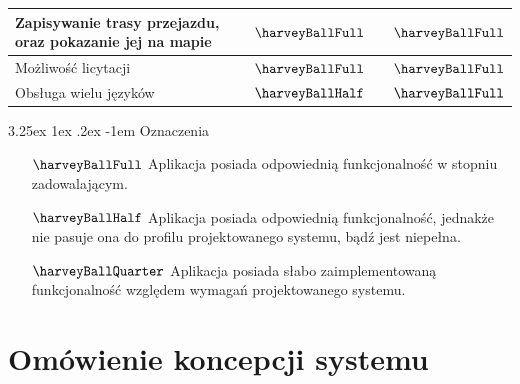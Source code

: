\documentclass[10pt,titlepage]{article} %
\makeatletter
\renewcommand{\normalsize}{\fontsize{8pt}{10pt}\selectfont} %
\renewcommand\paragraph{\@startsection{paragraph}{5}{\z@}%
  {3.25ex \@plus1ex \@minus.2ex}%
  {-1em}%
  {\normalfont\normalsize\bfseries}}
\makeatother
\begin{document}
\begin{table}[H]
\begin{tabular}{lccc}
\multicolumn{1}{|l|}{Zapisywanie trasy przejazdu, oraz pokazanie jej na mapie}                                                                                                   & \multicolumn{1}{c|}{$\harveyBallFull$}     & \multicolumn{1}{c|}{}              & \multicolumn{1}{c|}{$\harveyBallFull$}                                 \\ \hline
\multicolumn{1}{|l|}{Możliwość licytacji}                                                                                                                                        & \multicolumn{1}{c|}{$\harveyBallFull$}     & \multicolumn{1}{c|}{}              & \multicolumn{1}{c|}{$\harveyBallFull$}                                 \\ \hline
\multicolumn{1}{|l|}{Obsługa wielu języków}                                                                                                                                      & \multicolumn{1}{c|}{$\harveyBallHalf$} & \multicolumn{1}{c|}{}              & \multicolumn{1}{c|}{$\harveyBallFull$}                                                           \\ \hline
\end{tabular}
\end{table}

\paragraph{Oznaczenia}
\begin{enumerate}
\item[$\harveyBallFull$] Aplikacja posiada odpowiednią funkcjonalność w stopniu zadowalającym.
\item[$\harveyBallHalf$] Aplikacja posiada odpowiednią funkcjonalność, jednakże nie pasuje ona do profilu projektowanego systemu, bądź jest niepełna.
\item[$\harveyBallQuarter$] Aplikacja posiada słabo zaimplementowaną funkcjonalność względem wymagań projektowanego systemu.
\end{enumerate}




\newpage
\section{Omówienie koncepcji systemu}
\end{document}
